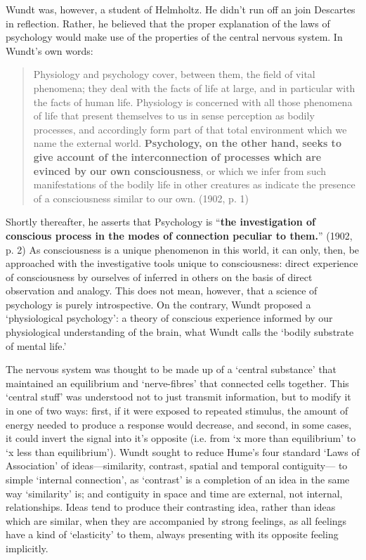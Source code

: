 Wundt was, however, a student of Helmholtz. He didn't run off an join Descartes in reflection. Rather, he believed that the proper explanation of the laws of psychology would make use of the properties of the central nervous system. In Wundt's own words:

\begin{quote}

Physiology and psychology cover, between them, the field of vital phenomena; they deal with the facts of life at large, and in particular with the facts of human life. Physiology is concerned with all those phenomena of life that present themselves to us in sense perception as bodily processes, and accordingly form part of that total environment which we name the external world. \textbf{Psychology, on the other hand, seeks to give account of the interconnection of processes which are evinced by our own consciousness}, or which we infer from such manifestations of the bodily life in other creatures as indicate the presence of a consciousness similar to our own. (1902, p. 1)
\end{quote}

Shortly thereafter, he asserts that Psychology is ``\textbf{the investigation of conscious process in the modes of connection peculiar to them.}'' (1902, p. 2) As consciousness is a unique phenomenon in this world, it can only, then, be approached with the investigative tools unique to consciousness: direct experience of consciousness by ourselves of inferred in others on the basis of direct observation and analogy. This does not mean, however, that a science of psychology is purely introspective. On the contrary, Wundt proposed a `physiological psychology': a theory of conscious experience informed by our physiological understanding of the brain, what Wundt calls the `bodily substrate of mental life.'

The nervous system was thought to be made up of a `central substance' that maintained an equilibrium and `nerve-fibres' that connected cells together. This `central stuff' was understood not to just transmit information, but to modify it in one of two ways: first, if it were exposed to repeated stimulus, the amount of energy needed to produce a response would decrease, and second, in some cases, it could invert the signal into it's opposite (i.e. from `x more than equilibrium' to `x less than equilibrium'). Wundt sought to reduce Hume's four standard `Laws of Association' of ideas---similarity, contrast, spatial and temporal contiguity--- to simple `internal connection', as `contrast' is a completion of an idea in the same way `similarity' is; and contiguity in space and time are external, not internal, relationships. Ideas tend to produce their contrasting idea, rather than ideas which are similar, when they are accompanied by strong feelings, as all feelings have a kind of `elasticity' to them, always presenting with its opposite feeling implicitly.

